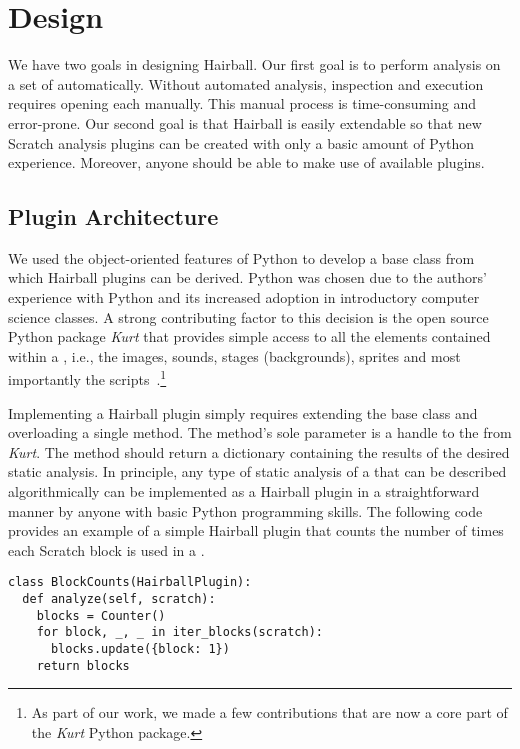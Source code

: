 \section{Design}

We have two goals in designing Hairball. Our first goal is to perform analysis
on a set of  automatically. Without automated analysis, inspection
and execution requires opening each \sprogram{} manually. This manual process
is time-consuming and error-prone.  Our second goal is that Hairball is easily
extendable so that new Scratch analysis plugins can be created with only a
basic amount of Python experience. Moreover, anyone should be able to make use
of available plugins.


\subsection{Plugin Architecture}
We used the object-oriented features of Python to develop a base class from
which Hairball plugins can be derived. Python was chosen due to the authors'
experience with Python and its increased adoption in introductory computer
science classes. A strong contributing factor to this decision is the open
source Python package \emph{Kurt} that provides simple access to all the
elements contained within a \sprogram{}, i.e., the images, sounds, stages
(backgrounds), sprites and most importantly the
scripts~\cite{Radvan:2012:Online}.\footnote{As part of our work, we made a few
  contributions that are now a core part of the \emph{Kurt} Python package.}

Implementing a Hairball plugin simply requires extending the base class and
overloading a single method. The method's sole parameter is a handle to the
\sprogram{} from \emph{Kurt}. The method should return a dictionary containing
the results of the desired static analysis. In principle, any type of static
analysis of a \sprogram{} that can be described algorithmically can be
implemented as a Hairball plugin in a straightforward manner by anyone with
basic Python programming skills. The following code provides an example of a
simple Hairball plugin that counts the number of times each Scratch block is
used in a \sprogram{}.

\begin{verbatim}
class BlockCounts(HairballPlugin):
  def analyze(self, scratch):
    blocks = Counter()
    for block, _, _ in iter_blocks(scratch):
      blocks.update({block: 1})
    return blocks
\end{verbatim}
